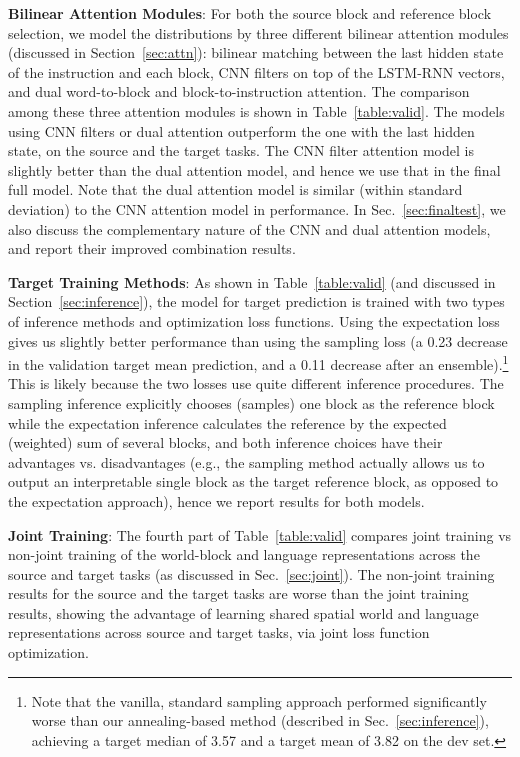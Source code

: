 \documentclass[letterpaper]{article} %
\begin{document}
\textbf{Bilinear Attention Modules}:
For both the source block and reference block selection, we model the distributions by three different bilinear attention modules (discussed in Section~\ref{sec:attn}): bilinear matching between the last hidden state of the instruction and each block, CNN filters on top of the LSTM-RNN vectors, and dual word-to-block and block-to-instruction attention. The comparison among these three attention modules is shown in Table~\ref{table:valid}.
The models using CNN filters or dual attention outperform the one with the last hidden state, on the source and the target tasks. The CNN filter attention model is slightly better than the dual attention model, and hence we use that in the final full model. Note that the dual attention model is similar (within standard deviation) to the CNN attention model in performance. In Sec.~\ref{sec:finaltest}, we also discuss the complementary nature of the CNN and dual attention models, and report their improved combination results.




\textbf{Target Training Methods}:
As shown in Table~\ref{table:valid} (and discussed in Section~\ref{sec:inference}), the model for target prediction is trained with two types of inference methods and optimization loss functions. Using the expectation loss gives us slightly better performance than using the sampling loss (a 0.23 decrease in the validation target mean prediction, and a 0.11 decrease after an ensemble).\footnote{Note that the vanilla, standard sampling approach performed significantly worse than our annealing-based method (described in Sec.~\ref{sec:inference}), achieving a target median of 3.57 and a target mean of 3.82 on the dev set.}
This is likely because the two losses use quite different inference procedures. The sampling inference explicitly chooses (samples) one block as the reference block while the expectation inference calculates the reference by the expected (weighted) sum of several blocks, and both inference choices have their advantages vs. disadvantages (e.g., the sampling method actually allows us to output an interpretable single block as the target reference block, as opposed to the expectation approach), hence we report results for both models.


\textbf{Joint Training}:
The fourth part of Table~\ref{table:valid} compares  joint training vs non-joint training of the world-block and language representations across the source and target tasks (as discussed in Sec.~\ref{sec:joint}). The non-joint training results for the source and the target tasks are worse than the joint training results, showing the advantage of learning shared spatial world and language representations across source and target tasks, via joint loss function optimization.
\end{document}
